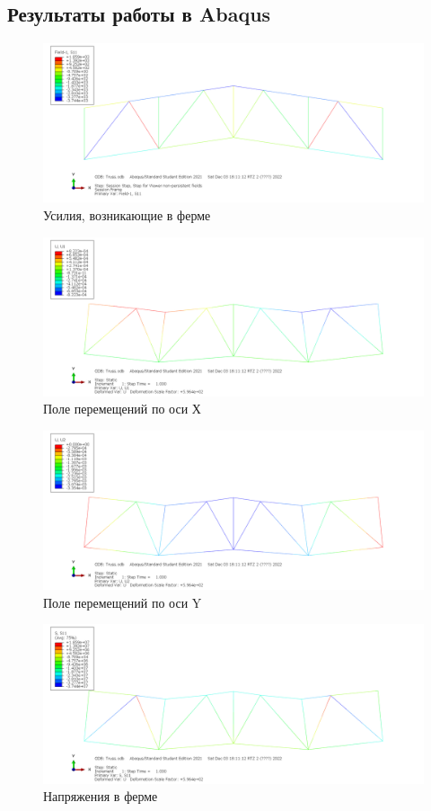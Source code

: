 \documentclass[12pt,a4paper]{article}
\begin{document}
	\subsection{Результаты работы в Abaqus}
	\begin{figure}[H]
		\centering
		\includegraphics[width=\textwidth]{fp}
		\caption{Усилия, возникающие в ферме}
		\label{pic1}
	\end{figure}
	\begin{figure}[H]
		\centering
		\includegraphics[width=\textwidth]{ux}
		\caption{Поле перемещений по оси Х}
		\label{pic2}
	\end{figure}
	\begin{figure}[H]
		\centering
		\includegraphics[width=\textwidth]{uy}
		\caption{Поле перемещений по оси Y}
		\label{pic3}
	\end{figure}
\begin{figure}[H]
	\centering
	\includegraphics[width=\textwidth]{s11}
	\caption{Напряжения в ферме}
	\label{pic3}
\end{figure}
\end{document}
